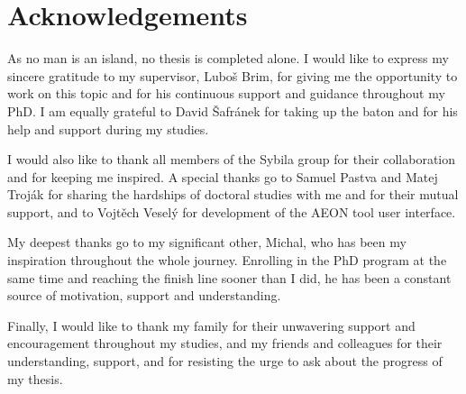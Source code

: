

\begingroup

\let\clearpage\relax
\let\cleardoublepage\relax
\let\cleardoublepage\relax

\chapter*{Acknowledgements}

As no man is an island, no thesis is completed alone. I would like to express my sincere gratitude to my supervisor, Luboš Brim, for giving me the opportunity to work on this topic and for his continuous support and guidance throughout my PhD. I am equally grateful to David Šafránek for taking up the baton and for his help and support during my studies.

I would also like to thank all members of the Sybila group for their collaboration and for keeping me inspired. A special thanks go to Samuel Pastva and Matej Troják for sharing the hardships of doctoral studies with me and for their mutual support, and to Vojtěch Veselý for development of the AEON tool user interface.

My deepest thanks go to my significant other, Michal, who has been my inspiration throughout the whole journey. Enrolling in the PhD program at the same time and reaching the finish line sooner than I did, he has been a constant source of motivation, support and understanding.

Finally, I would like to thank my family for their unwavering support and encouragement throughout my studies, and my friends and colleagues for their understanding, support, and for resisting the urge to ask about the progress of my thesis.

\endgroup

